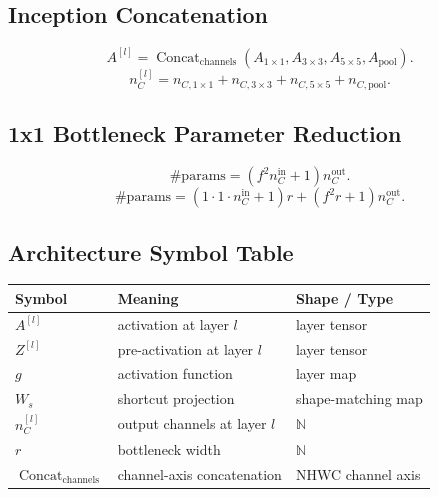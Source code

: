 \subsection{Inception Concatenation}

\[
A^{[l]}
=
\operatorname{Concat}_{\mathrm{channels}}
\left(
A_{1\times1},
A_{3\times3},
A_{5\times5},
A_{\mathrm{pool}}
\right).
\]
\[
n_C^{[l]}
=
n_{C,1\times1}
+
n_{C,3\times3}
+
n_{C,5\times5}
+
n_{C,\mathrm{pool}}.
\]

\subsection{1x1 Bottleneck Parameter Reduction}

\[
\#\mathrm{params}
=
(f^2 n_C^{\mathrm{in}} + 1)n_C^{\mathrm{out}}.
\]
\[
\#\mathrm{params}
=
(1 \cdot 1 \cdot n_C^{\mathrm{in}} + 1)r
+
(f^2 r + 1)n_C^{\mathrm{out}}.
\]

\subsection{Architecture Symbol Table}

\begin{center}
\begin{tabular}{lll}
\toprule
Symbol & Meaning & Shape / Type \\
\midrule
$A^{[l]}$ & activation at layer $l$ & layer tensor \\
$Z^{[l]}$ & pre-activation at layer $l$ & layer tensor \\
$g$ & activation function & layer map \\
$W_s$ & shortcut projection & shape-matching map \\
$n_C^{[l]}$ & output channels at layer $l$ & $\mathbb{N}$ \\
$r$ & bottleneck width & $\mathbb{N}$ \\
$\operatorname{Concat}_{\mathrm{channels}}$ & channel-axis concatenation & NHWC channel axis \\
\bottomrule
\end{tabular}
\end{center}
